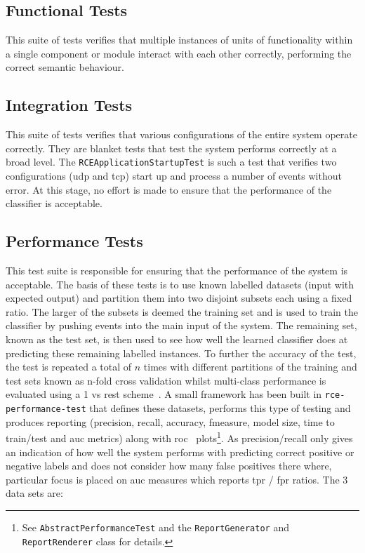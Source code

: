 \documentclass[a4paper,11pt]{scrreprt}
\begin{document}
\subsection{Functional Tests}
This suite of tests verifies that multiple instances of units of functionality within a single component or module interact with each other correctly, performing the correct semantic behaviour.
\subsection{Integration Tests}
This suite of tests verifies that various configurations of the entire system operate correctly. They are blanket tests that test the system performs correctly at a broad level. The \verb|RCEApplicationStartupTest| is such a test that verifies two configurations (\acrshort{udp} and \acrshort{tcp}) start up and process a number of events without error. At this stage, no effort is made to ensure that the performance of the classifier is acceptable.
\subsection{Performance Tests}
This test suite is responsible for ensuring that the performance of the system is acceptable. The basis of these tests is to use known labelled datasets (input with expected output) and partition them into two disjoint subsets each using a fixed ratio. The larger of the subsets is deemed the training set and is used to train the classifier by pushing events into the main input of the system. The remaining set, known as the test set, is then used to see how well the learned classifier does at predicting these remaining labelled instances. To further the accuracy of the test, the test is repeated a total of \(n\) times with different partitions of the training and test sets known as n-fold cross validation whilst multi-class performance is evaluated using a 1 vs rest scheme~\cite{flach}. A small framework has been built in \verb|rce-performance-test| that defines these datasets, performs this type of testing and produces reporting (precision, recall, accuracy, fmeasure, model size, time to train/test and \acrshort{auc} metrics) along with \acrshort{roc}~\cite{roc-analysis} plots\footnote{See \verb|AbstractPerformanceTest| and the \verb|ReportGenerator| and \verb|ReportRenderer| class for details.}. As precision/recall only gives an indication of how well the system performs with predicting correct positive or negative labels and does not consider how many false positives there where, particular focus is placed on \acrshort{auc} measures which reports \acrshort{tpr} / \acrshort{fpr} ratios. The 3 data sets are:
\end{document}

